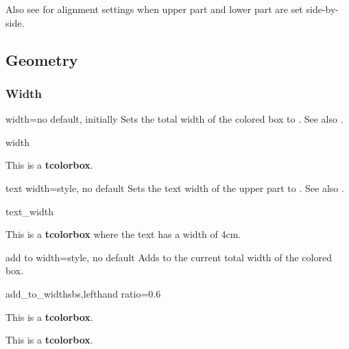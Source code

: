 Also see  for alignment settings when
upper part and lower part are set side-by-side.

\clearpage
\subsection{Geometry}
\subsubsection{Width}

\begin{docTcbKey}{width}{=}{no default, initially }
  Sets the total width of the colored box to .
  See also .
\begin{exdispExample}{width}

\begin{tcolorbox}[width=\linewidth/2]
This is a \textbf{tcolorbox}.
\end{tcolorbox}
\end{exdispExample}
\end{docTcbKey}


\begin{docTcbKey}[][doc new=2014-10-31]{text width}{=}{style, no default}
  Sets the text width of the upper part to .
  See also .
\begin{exdispExample}{text_width}

\begin{tcolorbox}[text width=4cm]
This is a \textbf{tcolorbox} where the text has a width of 4cm.
\end{tcolorbox}
\end{exdispExample}
\end{docTcbKey}

\begin{docTcbKey}[][doc new=2014-11-07]{add to width}{=}{style, no default}
  Adds  to the current total width of the colored box.
\begin{exdispExample*}{add_to_width}{sbs,lefthand ratio=0.6}

\begin{tcolorbox}
This is a \textbf{tcolorbox}.
\end{tcolorbox}

\begin{tcolorbox}[add to width=1cm]
This is a \textbf{tcolorbox}.
\end{tcolorbox}
\end{exdispExample*}
\end{docTcbKey}


